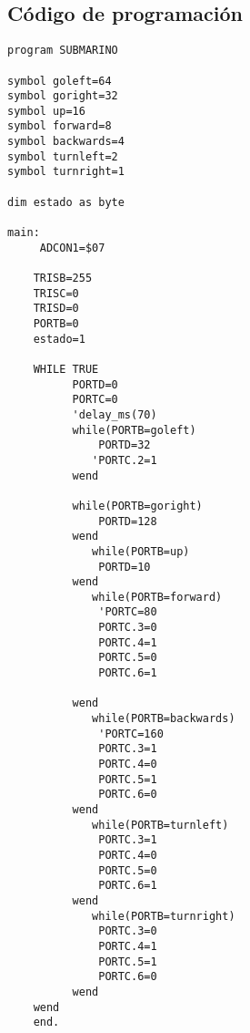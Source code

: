 \subsection{C\'odigo de programaci\'on}

\begin{lstlisting}
program SUBMARINO

symbol goleft=64
symbol goright=32
symbol up=16
symbol forward=8
symbol backwards=4
symbol turnleft=2
symbol turnright=1

dim estado as byte

main:
     ADCON1=$07

    TRISB=255
    TRISC=0
    TRISD=0
    PORTB=0
    estado=1

    WHILE TRUE
          PORTD=0
          PORTC=0
          'delay_ms(70)
          while(PORTB=goleft)
              PORTD=32
             'PORTC.2=1
          wend

          while(PORTB=goright)
              PORTD=128
          wend
             while(PORTB=up)
              PORTD=10
          wend
             while(PORTB=forward)
              'PORTC=80
              PORTC.3=0
              PORTC.4=1
              PORTC.5=0
              PORTC.6=1
              
          wend
             while(PORTB=backwards)
              'PORTC=160
              PORTC.3=1
              PORTC.4=0
              PORTC.5=1
              PORTC.6=0
          wend
             while(PORTB=turnleft)
              PORTC.3=1
              PORTC.4=0
              PORTC.5=0
              PORTC.6=1
          wend
             while(PORTB=turnright)
              PORTC.3=0
              PORTC.4=1
              PORTC.5=1
              PORTC.6=0
          wend
    wend
    end.
\end{lstlisting}